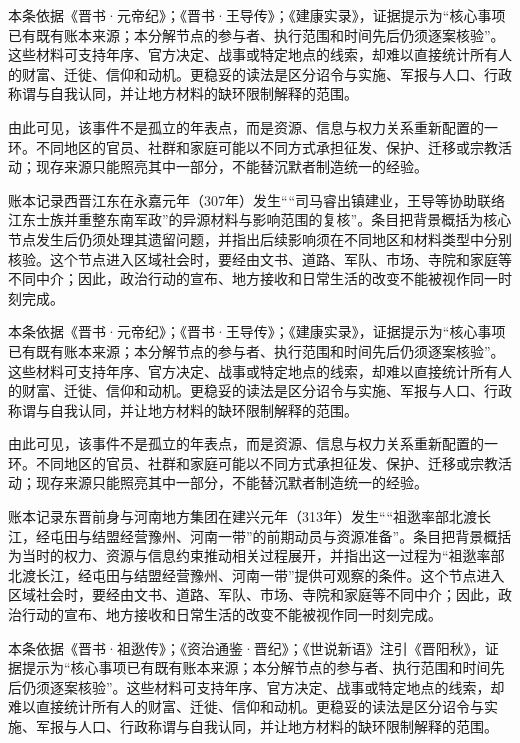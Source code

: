 本条依据《晋书·元帝纪》；《晋书·王导传》；《建康实录》，证据提示为“核心事项已有既有账本来源；本分解节点的参与者、执行范围和时间先后仍须逐案核验”。这些材料可支持年序、官方决定、战事或特定地点的线索，却难以直接统计所有人的财富、迁徙、信仰和动机。更稳妥的读法是区分诏令与实施、军报与人口、行政称谓与自我认同，并让地方材料的缺环限制解释的范围。

由此可见，该事件不是孤立的年表点，而是资源、信息与权力关系重新配置的一环。不同地区的官员、社群和家庭可能以不同方式承担征发、保护、迁移或宗教活动；现存来源只能照亮其中一部分，不能替沉默者制造统一的经验。

账本记录西晋江东在永嘉元年（307年）发生““司马睿出镇建业，王导等协助联络江东士族并重整东南军政”的异源材料与影响范围的复核”。条目把背景概括为核心节点发生后仍须处理其遗留问题，并指出后续影响须在不同地区和材料类型中分别核验。这个节点进入区域社会时，要经由文书、道路、军队、市场、寺院和家庭等不同中介；因此，政治行动的宣布、地方接收和日常生活的改变不能被视作同一时刻完成。

本条依据《晋书·元帝纪》；《晋书·王导传》；《建康实录》，证据提示为“核心事项已有既有账本来源；本分解节点的参与者、执行范围和时间先后仍须逐案核验”。这些材料可支持年序、官方决定、战事或特定地点的线索，却难以直接统计所有人的财富、迁徙、信仰和动机。更稳妥的读法是区分诏令与实施、军报与人口、行政称谓与自我认同，并让地方材料的缺环限制解释的范围。

由此可见，该事件不是孤立的年表点，而是资源、信息与权力关系重新配置的一环。不同地区的官员、社群和家庭可能以不同方式承担征发、保护、迁移或宗教活动；现存来源只能照亮其中一部分，不能替沉默者制造统一的经验。

账本记录东晋前身与河南地方集团在建兴元年（313年）发生““祖逖率部北渡长江，经屯田与结盟经营豫州、河南一带”的前期动员与资源准备”。条目把背景概括为当时的权力、资源与信息约束推动相关过程展开，并指出这一过程为“祖逖率部北渡长江，经屯田与结盟经营豫州、河南一带”提供可观察的条件。这个节点进入区域社会时，要经由文书、道路、军队、市场、寺院和家庭等不同中介；因此，政治行动的宣布、地方接收和日常生活的改变不能被视作同一时刻完成。

本条依据《晋书·祖逖传》；《资治通鉴·晋纪》；《世说新语》注引《晋阳秋》，证据提示为“核心事项已有既有账本来源；本分解节点的参与者、执行范围和时间先后仍须逐案核验”。这些材料可支持年序、官方决定、战事或特定地点的线索，却难以直接统计所有人的财富、迁徙、信仰和动机。更稳妥的读法是区分诏令与实施、军报与人口、行政称谓与自我认同，并让地方材料的缺环限制解释的范围。

